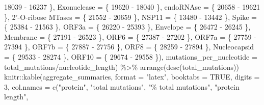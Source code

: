 \documentclass{article}
\newenvironment{Shaded}{\begin{snugshade}}{\end{snugshade}}
\newcommand{\AttributeTok}[1]{\textcolor[rgb]{0.77,0.63,0.00}{#1}}
\newcommand{\ConstantTok}[1]{\textcolor[rgb]{0.00,0.00,0.00}{#1}}
\newcommand{\DecValTok}[1]{\textcolor[rgb]{0.00,0.00,0.81}{#1}}
\newcommand{\FunctionTok}[1]{\textcolor[rgb]{0.00,0.00,0.00}{#1}}
\newcommand{\NormalTok}[1]{#1}
\newcommand{\OtherTok}[1]{\textcolor[rgb]{0.56,0.35,0.01}{#1}}
\newcommand{\SpecialCharTok}[1]{\textcolor[rgb]{0.00,0.00,0.00}{#1}}
\newcommand{\StringTok}[1]{\textcolor[rgb]{0.31,0.60,0.02}{#1}}
\begin{document}
\begin{Shaded}
\begin{Highlighting}[]
            \DecValTok{18039} \SpecialCharTok{{-}} \DecValTok{16237}
\NormalTok{        \}, }\AttributeTok{Exonuclease =}\NormalTok{ \{}
            \DecValTok{19620} \SpecialCharTok{{-}} \DecValTok{18040}
\NormalTok{        \}, }\AttributeTok{endoRNAse =}\NormalTok{ \{}
            \DecValTok{20658} \SpecialCharTok{{-}} \DecValTok{19621}
\NormalTok{        \}, }\StringTok{\textasciigrave{}}\AttributeTok{2’{-}O{-}ribose MTases}\StringTok{\textasciigrave{}} \OtherTok{=}\NormalTok{ \{}
            \DecValTok{21552} \SpecialCharTok{{-}} \DecValTok{20659}
\NormalTok{        \}, }\AttributeTok{NSP11 =}\NormalTok{ \{}
            \DecValTok{13480} \SpecialCharTok{{-}} \DecValTok{13442}
\NormalTok{        \}, }\AttributeTok{Spike =}\NormalTok{ \{}
            \DecValTok{25384} \SpecialCharTok{{-}} \DecValTok{21563}
\NormalTok{        \}, }\AttributeTok{ORF3a =}\NormalTok{ \{}
            \DecValTok{26220} \SpecialCharTok{{-}} \DecValTok{25393}
\NormalTok{        \}, }\AttributeTok{Envelope =}\NormalTok{ \{}
            \DecValTok{26472} \SpecialCharTok{{-}} \DecValTok{26245}
\NormalTok{        \}, }\AttributeTok{Membrane =}\NormalTok{ \{}
            \DecValTok{27191} \SpecialCharTok{{-}} \DecValTok{26523}
\NormalTok{        \}, }\AttributeTok{ORF6 =}\NormalTok{ \{}
            \DecValTok{27387} \SpecialCharTok{{-}} \DecValTok{27202}
\NormalTok{        \}, }\AttributeTok{ORF7a =}\NormalTok{ \{}
            \DecValTok{27759} \SpecialCharTok{{-}} \DecValTok{27394}
\NormalTok{        \}, }\AttributeTok{ORF7b =}\NormalTok{ \{}
            \DecValTok{27887} \SpecialCharTok{{-}} \DecValTok{27756}
\NormalTok{        \}, }\AttributeTok{ORF8 =}\NormalTok{ \{}
            \DecValTok{28259} \SpecialCharTok{{-}} \DecValTok{27894}
\NormalTok{        \}, }\AttributeTok{Nucleocapsid =}\NormalTok{ \{}
            \DecValTok{29533} \SpecialCharTok{{-}} \DecValTok{28274}
\NormalTok{        \}, }\AttributeTok{ORF10 =}\NormalTok{ \{}
            \DecValTok{29674} \SpecialCharTok{{-}} \DecValTok{29558}
\NormalTok{        \}), }\AttributeTok{mutations\_per\_nucleotide =}\NormalTok{ total\_mutations}\SpecialCharTok{/}\NormalTok{nucleotide\_length) }\SpecialCharTok{\%\textgreater{}\%}
    \FunctionTok{arrange}\NormalTok{(}\FunctionTok{desc}\NormalTok{(total\_mutations))}
\NormalTok{knitr}\SpecialCharTok{::}\FunctionTok{kable}\NormalTok{(aggregate\_summaries, }\AttributeTok{format =} \StringTok{"latex"}\NormalTok{, }\AttributeTok{booktabs =} \ConstantTok{TRUE}\NormalTok{, }\AttributeTok{digits =} \DecValTok{3}\NormalTok{,}
    \AttributeTok{col.names =} \FunctionTok{c}\NormalTok{(}\StringTok{"protein"}\NormalTok{, }\StringTok{"total mutations"}\NormalTok{, }\StringTok{"\% total mutations"}\NormalTok{, }\StringTok{"protein length"}\NormalTok{,}

\end{Highlighting}
\end{Shaded}
\end{document}
